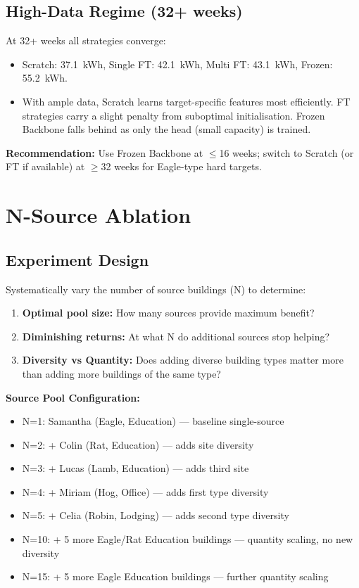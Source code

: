 \documentclass[12pt,a4paper]{report}
\begin{document}
\subsection{High-Data Regime (32+ weeks)}

At 32+ weeks all strategies converge:

\begin{itemize}
    \item Scratch: 37.1~kWh, Single FT: 42.1~kWh, Multi FT: 43.1~kWh, Frozen: 55.2~kWh.
    \item With ample data, Scratch learns target-specific features most efficiently. FT strategies carry a slight penalty from suboptimal initialisation. Frozen Backbone falls behind as only the head (small capacity) is trained.
\end{itemize}

\textbf{Recommendation:} Use Frozen Backbone at $\leq$16 weeks; switch to Scratch (or FT if available) at $\geq$32 weeks for Eagle-type hard targets.

\section{N-Source Ablation}

\subsection{Experiment Design}

Systematically vary the number of source buildings (N) to determine:

\begin{enumerate}
    \item \textbf{Optimal pool size:} How many sources provide maximum benefit?
    \item \textbf{Diminishing returns:} At what N do additional sources stop helping?
    \item \textbf{Diversity vs Quantity:} Does adding diverse building types matter more than adding more buildings of the same type?
\end{enumerate}

\textbf{Source Pool Configuration:}

\begin{itemize}
    \item N=1: Samantha (Eagle, Education) — baseline single-source
    \item N=2: + Colin (Rat, Education) — adds site diversity
    \item N=3: + Lucas (Lamb, Education) — adds third site
    \item N=4: + Miriam (Hog, Office) — adds first type diversity
    \item N=5: + Celia (Robin, Lodging) — adds second type diversity
    \item N=10: + 5 more Eagle/Rat Education buildings — quantity scaling, no new diversity
    \item N=15: + 5 more Eagle Education buildings — further quantity scaling
\end{itemize}
\end{document}
